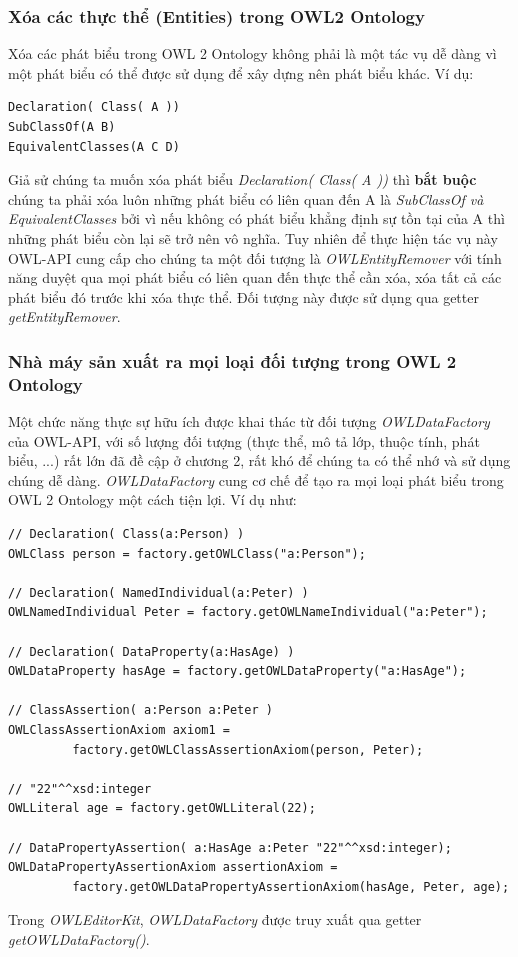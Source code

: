 \subsubsection{Xóa các thực thể (Entities) trong OWL2 Ontology}
Xóa các phát biểu trong OWL 2 Ontology không phải là một tác vụ dễ dàng vì một phát biểu có thể được sử dụng để xây dựng nên phát biểu khác. Ví dụ:
\begin{verbatim}
Declaration( Class( A ))
SubClassOf(A B)
EquivalentClasses(A C D)
\end{verbatim}
Giả sử chúng ta muốn xóa phát biểu \textit{Declaration( Class( A ))} thì \textbf{bắt buộc} chúng ta phải xóa luôn những phát biểu có liên quan đến A là \textit{SubClassOf và EquivalentClasses} bởi vì nếu không có phát biểu khẳng định sự tồn tại của A thì những phát biểu còn lại sẽ trở nên vô nghĩa. Tuy nhiên để thực hiện tác vụ này OWL-API cung cấp cho chúng ta một đối tượng là \textit{OWLEntityRemover} với tính năng duyệt qua mọi phát biểu có liên quan đến thực thể cần xóa, xóa tất cả các phát biểu đó trước khi xóa thực thể. Đối tượng này được sử dụng qua getter \textit{getEntityRemover}.

\subsubsection{Nhà máy sản xuất ra mọi loại đối tượng trong OWL 2 Ontology}
Một chức năng thực sự hữu ích được khai thác từ đối tượng \textit{OWLDataFactory} của OWL-API, với số lượng đối tượng (thực thể, mô tả lớp, thuộc tính, phát biểu, ...) rất lớn đã đề cập ở chương 2, rất khó để chúng ta có thể nhớ và sử dụng chúng dễ dàng. \textit{OWLDataFactory} cung cơ chế để tạo ra mọi loại phát biểu trong OWL 2 Ontology một cách tiện lợi. Ví dụ như:
\begin{verbatim}
// Declaration( Class(a:Person) )
OWLClass person = factory.getOWLClass("a:Person");

// Declaration( NamedIndividual(a:Peter) )
OWLNamedIndividual Peter = factory.getOWLNameIndividual("a:Peter");

// Declaration( DataProperty(a:HasAge) )
OWLDataProperty hasAge = factory.getOWLDataProperty("a:HasAge");

// ClassAssertion( a:Person a:Peter )
OWLClassAssertionAxiom axiom1 = 
         factory.getOWLClassAssertionAxiom(person, Peter);
         
// "22"^^xsd:integer 
OWLLiteral age = factory.getOWLLiteral(22);

// DataPropertyAssertion( a:HasAge a:Peter "22"^^xsd:integer); 
OWLDataPropertyAssertionAxiom assertionAxiom = 
         factory.getOWLDataPropertyAssertionAxiom(hasAge, Peter, age);
\end{verbatim}
Trong \textit{OWLEditorKit}, \textit{OWLDataFactory} được truy xuất qua getter \textit{getOWLDataFactory()}.

